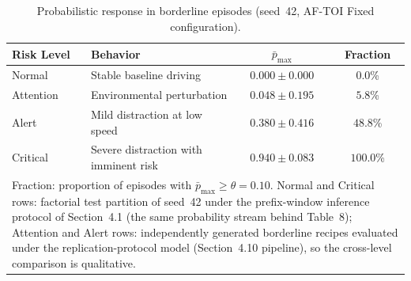 \documentclass[1p,12pt,authoryear]{elsarticle}
\providecommand{\revcolor}{blue}
\begin{document}
\begin{table}[!tbp]
\centering
\caption{Probabilistic response in borderline episodes
(seed~42, \mbox{AF-TOI} Fixed configuration).}

\footnotesize
\renewcommand{\arraystretch}{1.22}
\setlength{\tabcolsep}{3pt}
\begin{tabularx}{\columnwidth}{l X c c}
\toprule
\textbf{Risk Level} & \textbf{Behavior}
  & \textbf{$\bar{p}_{\max}$} & \textbf{Fraction} \\
\midrule
Normal    & Stable baseline driving
  & {\color{\revcolor}$0.000 \pm 0.000$} & $0.0$\% \\
\rowcolor{gray!8}
Attention & Environmental perturbation
  & $0.048 \pm 0.195$ & $5.8$\% \\
Alert     & Mild distraction at low speed
  & $0.380 \pm 0.416$ & $48.8$\% \\
\rowcolor{gray!8}
Critical  & Severe distraction with imminent risk
  & {\color{\revcolor}$0.940 \pm 0.083$} & {\color{\revcolor}$100.0$\%} \\
\bottomrule
\multicolumn{4}{p{0.96\columnwidth}}{\scriptsize
Fraction: proportion of episodes with $\bar{p}_{\max} \ge \theta = 0.10$.
{\color{\revcolor}Normal and Critical rows: factorial test partition of
seed~42 under the prefix-window inference protocol of
Section~4.1 (the same probability stream behind
Table~8); Attention and Alert rows:
independently generated borderline recipes evaluated under the
replication-protocol model (Section~4.10
pipeline), so the cross-level comparison is qualitative.}}
\end{tabularx}
\end{table}
\end{document}
